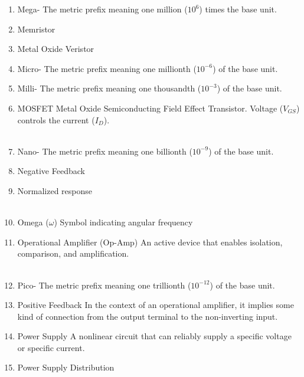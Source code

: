 \documentclass{IEEEtran}
\begin{document}
\begin{enumerate}
\\
\item Mega-
  \subitem The metric prefix meaning one million ($10^{6}$) times the base unit.\\
\item Memristor
  \subitem \\
\item Metal Oxide Veristor
  \subitem \\
\item Micro-
  \subitem The metric prefix meaning one millionth ($10^{-6}$) of the base unit.\\
\item Milli-
  \subitem The metric prefix meaning one thousandth ($10^{-3}$) of the base unit.\\
\item MOSFET
  \subitem Metal Oxide Semiconducting Field Effect Transistor. Voltage ($V_{GS}$) controls the current ($I_D$). \\

\\
\item Nano-
  \subitem The metric prefix meaning one billionth ($10^{-9}$) of the base unit.\\
\item Negative Feedback
  \subitem \\
\item Normalized response
  \subitem \\ 

\\
\item Omega ($\omega$)
  \subitem Symbol indicating angular frequency\\
\item Operational Amplifier (Op-Amp)
  \subitem An active device that enables isolation, comparison, and amplification.\\


\\
\item Pico-
  \subitem The metric prefix meaning one trillionth ($10^{-12}$) of the base unit.\\
\item Positive Feedback
  \subitem In the context of an operational amplifier, it implies some kind of connection from the output terminal to the non-inverting input. \\
\item Power Supply 
  \subitem A nonlinear circuit that can reliably supply a specific voltage or specific current. \\
\item Power Supply Distribution 
  \subitem \\


\end{enumerate}
\end{document}
